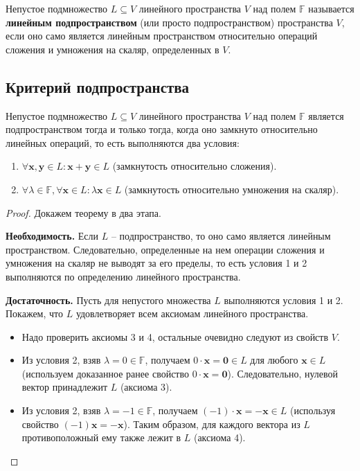\documentclass[10pt]{article}
\begin{document}
\begin{definition}
Непустое подмножество \(L \subseteq V\) линейного пространства \(V\) над полем \(\mathbb{F}\) называется \textbf{линейным подпространством} (или просто подпространством) пространства \(V\), если оно само является линейным пространством относительно операций сложения и умножения на скаляр, определенных в \(V\).
\end{definition}

\subsection{Критерий подпространства}

\begin{theorem}
Непустое подмножество \(L \subseteq V\) линейного пространства \(V\) над полем \(\mathbb{F}\) является подпространством тогда и только тогда, когда оно замкнуто относительно линейных операций, то есть выполняются два условия:
\begin{enumerate}
    \item \(\forall \mathbf{x}, \mathbf{y} \in L: \mathbf{x} + \mathbf{y} \in L\) (замкнутость относительно сложения).
    \item \(\forall \lambda \in \mathbb{F}, \forall \mathbf{x} \in L: \lambda\mathbf{x} \in L\) (замкнутость относительно умножения на скаляр).
\end{enumerate}
\end{theorem}

\begin{proof}
Докажем теорему в два этапа.

\textbf{Необходимость.} Если \(L\) -- подпространство, то оно само является линейным пространством. Следовательно, определенные на нем операции сложения и умножения на скаляр не выводят за его пределы, то есть условия 1 и 2 выполняются по определению линейного пространства.

\textbf{Достаточность.} Пусть для непустого множества \(L\) выполняются условия 1 и 2. Покажем, что \(L\) удовлетворяет всем аксиомам линейного пространства.
\begin{itemize}
    \item Надо проверить аксиомы 3 и 4, остальные очевидно следуют из свойств $V$.
    \item Из условия 2, взяв \(\lambda = 0 \in \mathbb{F}\), получаем \(0 \cdot \mathbf{x} = \mathbf{0} \in L\) для любого \(\mathbf{x} \in L\) (используем доказанное ранее свойство \(0\cdot\mathbf{x} = \mathbf{0}\)). Следовательно, нулевой вектор принадлежит \(L\) (аксиома 3).
    \item Из условия 2, взяв \(\lambda = -1 \in \mathbb{F}\), получаем \((-1)\cdot\mathbf{x} = -\mathbf{x} \in L\) (используя свойство \((-1)\mathbf{x} = -\mathbf{x}\)). Таким образом, для каждого вектора из \(L\) противоположный ему также лежит в \(L\) (аксиома 4).
\end{itemize}
\end{proof}
\end{document}

